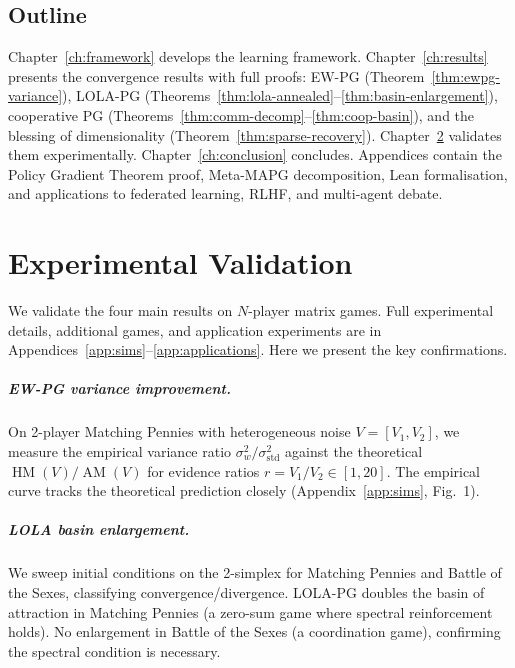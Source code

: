 \documentclass[a4paper,oneside,11pt]{report}
\begin{document}
\section{Outline}

Chapter~\ref{ch:framework} develops the learning framework. Chapter~\ref{ch:results} presents the convergence results with full proofs: EW-PG (Theorem~\ref{thm:ewpg-variance}), LOLA-PG (Theorems~\ref{thm:lola-annealed}--\ref{thm:basin-enlargement}), cooperative PG (Theorems~\ref{thm:comm-decomp}--\ref{thm:coop-basin}), and the blessing of dimensionality (Theorem~\ref{thm:sparse-recovery}). Chapter~\ref{ch:simulations} validates them experimentally. Chapter~\ref{ch:conclusion} concludes. Appendices contain the Policy Gradient Theorem proof, Meta-MAPG decomposition, Lean formalisation, and applications to federated learning, RLHF, and multi-agent debate.







\chapter{Experimental Validation}
\label{ch:simulations}

We validate the four main results on $N$-player matrix games. Full experimental details, additional games, and application experiments are in Appendices~\ref{app:sims}--\ref{app:applications}. Here we present the key confirmations.

\paragraph{EW-PG variance improvement.} On 2-player Matching Pennies with heterogeneous noise $V = [V_1, V_2]$, we measure the empirical variance ratio $\sigma_w^2/\sigma_{\text{std}}^2$ against the theoretical $\operatorname{HM}(V)/\operatorname{AM}(V)$ for evidence ratios $r = V_1/V_2 \in [1, 20]$. The empirical curve tracks the theoretical prediction closely (Appendix~\ref{app:sims}, Fig.~1).

\paragraph{LOLA basin enlargement.} We sweep initial conditions on the 2-simplex for Matching Pennies and Battle of the Sexes, classifying convergence/divergence. LOLA-PG doubles the basin of attraction in Matching Pennies (a zero-sum game where spectral reinforcement holds). No enlargement in Battle of the Sexes (a coordination game), confirming the spectral condition is necessary.
\end{document}
